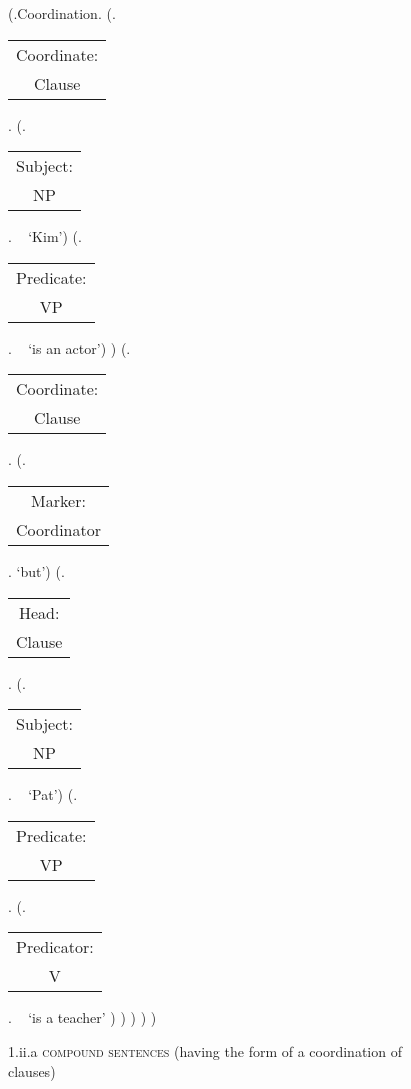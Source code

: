 \documentclass[12pt,letterpaper]{article}
\begin{document}
	\begin{figure}
	\begin{center}
		\begin{parsetree}
			(.Coordination.
			(.\begin{tabular}{c}Coordinate:\\Clause\end{tabular}. 
			(.\begin{tabular}{c}Subject:\\NP\end{tabular}.  ~ `Kim')
			(.\begin{tabular}{c}Predicate:\\VP\end{tabular}. ~ `is an actor')
			)
			(.\begin{tabular}{c}Coordinate:\\Clause\end{tabular}. 
				(.\begin{tabular}{c}Marker:\\Coordinator\end{tabular}.  `but')
			(.\begin{tabular}{c}Head:\\Clause\end{tabular}. 
			(.\begin{tabular}{c}Subject:\\NP\end{tabular}.  ~ `Pat')
			(.\begin{tabular}{c}Predicate:\\VP\end{tabular}.
			(.\begin{tabular}{c}Predicator:\\V\end{tabular}.   ~ `is a teacher' )
			)
			)
			)
			)
			
			\hfill \break\hfill \break
		\end{parsetree}
		1.ii.a \textsc{compound sentences} (having the form of a coordination of clauses)
	\end{center}
\end{figure}
\end{document}

